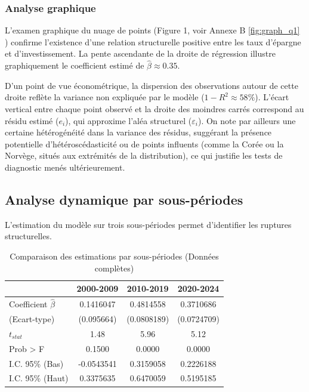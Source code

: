 \documentclass[12pt, a4paper]{article}
\begin{document}
\subsubsection*{Analyse graphique}
L'examen graphique du nuage de points (Figure 1, voir Annexe B \ref{fig:graph_q1} ) confirme l'existence d'une relation structurelle positive entre les taux d'épargne et d'investissement. La pente ascendante de la droite de régression illustre graphiquement le coefficient estimé de $\hat{\beta} \approx 0.35$.

D'un point de vue économétrique, la dispersion des observations autour de cette droite reflète la variance non expliquée par le modèle ($1 - R^2 \approx 58\%$). L'écart vertical entre chaque point observé et la droite des moindres carrés correspond au résidu estimé ($e_i$), qui approxime l'aléa structurel ($\varepsilon_i$). On note par ailleurs une certaine hétérogénéité dans la variance des résidus, suggérant la présence potentielle d'hétéroscédasticité ou de points influents (comme la Corée ou la Norvège, situés aux extrémités de la distribution), ce qui justifie les tests de diagnostic menés ultérieurement.




\subsection{Analyse dynamique par sous-périodes}

L'estimation du modèle sur trois sous-périodes permet d'identifier les ruptures structurelles.

\begin{table}[H]
    \centering
    \caption{Comparaison des estimations par sous-périodes (Données complètes)}
    \begin{tabular}{lccc}
        \toprule
         & \textbf{2000-2009} & \textbf{2010-2019} & \textbf{2020-2024} \\
        \midrule
        Coefficient $\hat{\beta}$ & 0.1416047 & 0.4814558 & 0.3710686 \\
        (Ecart-type) & (0.095664) & (0.0808189) & (0.0724709) \\
        $t_{stat}$ & 1.48 & 5.96 & 5.12 \\
        Prob > F & 0.1500 & 0.0000 & 0.0000 \\
        \midrule
        I.C. 95\% (Bas) & -0.0543541 & 0.3159058 & 0.2226188 \\
        I.C. 95\% (Haut) & 0.3375635 & 0.6470059 & 0.5195185 \\
        \bottomrule
    \end{tabular}
\end{table}
\end{document}
